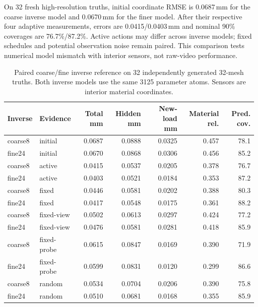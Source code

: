 On 32 fresh high-resolution truths, initial coordinate RMSE is 0.0687\,mm for the coarse inverse model and 0.0670\,mm for the finer model. After their respective four adaptive measurements, errors are 0.0415/0.0403\,mm and nominal 90\% coverages are 76.7\%/87.2\%. Active actions may differ across inverse models; fixed schedules and potential observation noise remain paired. This comparison tests numerical model mismatch with interior sensors, not raw-video performance.
\begin{table}[!t]\centering\small\setlength{\tabcolsep}{4pt}
\caption{Paired coarse/fine inverse reference on 32 independently generated 32-mesh truths. Both inverse models use the same 3125 parameter atoms. Sensors are interior material coordinates.}
\begin{tabular}{llrrrrr}\toprule
Inverse & Evidence & Total mm & Hidden mm & New-load mm & Material rel. & Pred. cov.\\\midrule
coarse8 & initial & 0.0687 & 0.0888 & 0.0325 & 0.457 & 78.1\\
fine24 & initial & 0.0670 & 0.0868 & 0.0306 & 0.456 & 85.2\\
coarse8 & active & 0.0415 & 0.0537 & 0.0205 & 0.378 & 76.7\\
fine24 & active & 0.0403 & 0.0521 & 0.0184 & 0.353 & 87.2\\
coarse8 & fixed & 0.0446 & 0.0581 & 0.0202 & 0.388 & 80.3\\
fine24 & fixed & 0.0417 & 0.0548 & 0.0175 & 0.361 & 88.2\\
coarse8 & fixed-view & 0.0502 & 0.0613 & 0.0297 & 0.424 & 77.2\\
fine24 & fixed-view & 0.0476 & 0.0581 & 0.0281 & 0.418 & 85.9\\
coarse8 & fixed-probe & 0.0615 & 0.0847 & 0.0169 & 0.390 & 71.9\\
fine24 & fixed-probe & 0.0599 & 0.0831 & 0.0120 & 0.299 & 86.6\\
coarse8 & random & 0.0534 & 0.0704 & 0.0206 & 0.390 & 75.8\\
fine24 & random & 0.0510 & 0.0681 & 0.0168 & 0.355 & 85.9\\
\bottomrule\end{tabular}
\end{table}